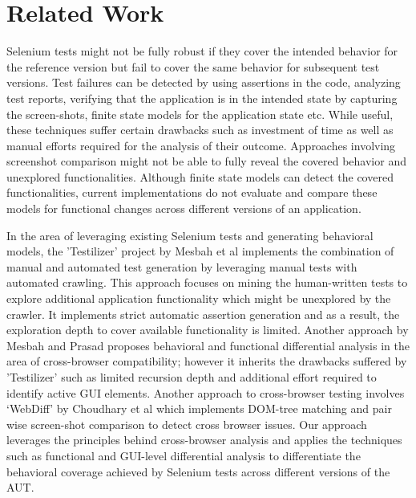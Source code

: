 \chapter{Related Work} %

\label{Chapter3} %


Selenium tests might not be fully robust if they cover the intended behavior for the reference version but fail to cover the same behavior for subsequent test versions. Test failures can be detected by using assertions in the code, analyzing test reports, verifying that the application is in the intended state by capturing the screen-shots, finite state models for the application state etc. While useful, these techniques suffer certain drawbacks such as investment of time as well as manual efforts required for the analysis of their outcome. Approaches involving screenshot comparison might not be able to fully reveal the covered behavior and unexplored functionalities. Although finite state models can detect the covered functionalities, current implementations do not evaluate and compare these models for functional changes across different versions of an application. 

In the area of leveraging existing Selenium tests and generating behavioral models, the 'Testilizer' project by Mesbah et al \cite{testilizer} implements the combination of manual and automated test generation by leveraging manual tests with automated crawling. This approach focuses on mining the human-written tests to explore additional application functionality which might be unexplored by the crawler. It implements strict automatic assertion generation and as a result, the exploration depth to cover available functionality is limited. Another approach by Mesbah and Prasad \cite{CBCMesbah} proposes behavioral and functional differential analysis in the area of cross-browser compatibility; however it inherits the drawbacks suffered by 'Testilizer' such as limited recursion depth and additional effort required to identify active GUI elements. Another approach to cross-browser testing involves ‘WebDiff’ by Choudhary et al \cite{WebDiff} which implements DOM-tree matching and pair wise screen-shot comparison to detect cross browser issues. Our approach leverages the principles behind cross-browser analysis and applies the techniques such as functional and GUI-level differential analysis to differentiate the behavioral coverage achieved by Selenium tests across different versions of the AUT.

